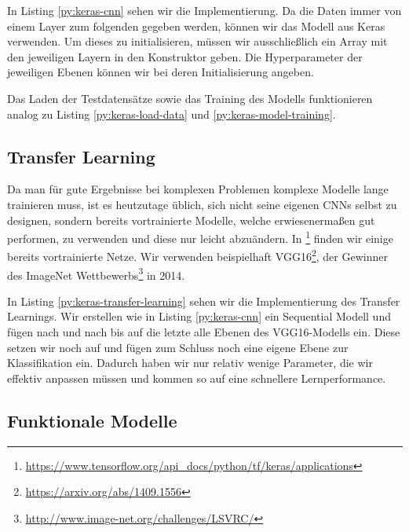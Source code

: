 In Listing \ref{py:keras-cnn} sehen wir die Implementierung. Da die Daten immer von einem Layer zum 
folgenden gegeben werden, können wir das  Modell aus Keras verwenden. 
Um dieses zu initialisieren, müssen wir ausschließlich ein Array mit den jeweiligen Layern in den 
Konstruktor geben. Die Hyperparameter der jeweiligen Ebenen können wir bei deren Initialisierung angeben.



Das Laden der Testdatensätze sowie das Training des Modells funktionieren analog zu Listing \ref{py:keras-load-data} 
und \ref{py:keras-model-training}. 

\subsection{Transfer Learning}

Da man für gute Ergebnisse bei komplexen Problemen komplexe Modelle lange trainieren muss, 
ist es heutzutage üblich, sich nicht seine eigenen CNNs selbst zu designen, sondern bereits vortrainierte 
Modelle, welche erwiesenermaßen gut performen, zu verwenden und diese nur leicht abzuändern. 
In \footnote{\url{https://www.tensorflow.org/api_docs/python/tf/keras/applications}}
finden wir einige bereits vortrainierte Netze. Wir verwenden beispielhaft VGG16\footnote{\url{https://arxiv.org/abs/1409.1556}}, 
der Gewinner des ImageNet Wettbewerbs\footnote{\url{http://www.image-net.org/challenges/LSVRC/}} in 2014. 



In Listing \ref{py:keras-transfer-learning} sehen wir die Implementierung des Transfer Learnings. 
Wir erstellen wie in Listing \ref{py:keras-cnn} ein Sequential Modell und fügen nach und nach 
bis auf die letzte alle Ebenen des VGG16-Modells ein. Diese setzen wir noch auf  
und fügen zum Schluss noch eine eigene Ebene zur Klassifikation ein. Dadurch haben wir nur relativ wenige Parameter, 
die wir effektiv anpassen müssen und kommen so auf eine schnellere Lernperformance.

\subsection{Funktionale Modelle}

